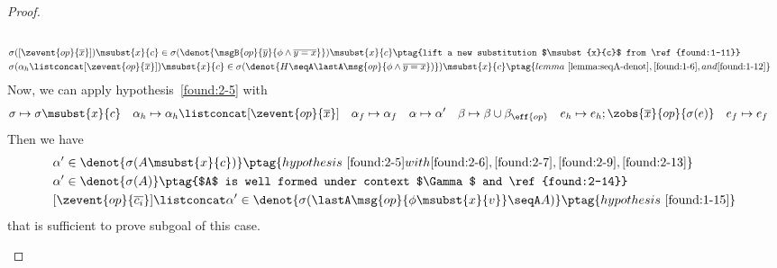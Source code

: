 \begin{proof}
\begin{enumerate}[label=Case]
{\begin{alignat}{2}
\\& \sigma([\zevent{op}{\overline{x}}])\msubst{x}{c} \in \sigma(\denot{\msgB{op}{\overline{y}}{\phi \land \overline{y = x}}})\msubst{x}{c} \ptag{lift a new substitution $\msubst{x}{c}$ from \ref{found:1-11}} \label{found:1-12}
\\& \sigma(\alpha_h \listconcat [\zevent{op}{\overline{x}}])\msubst{x}{c} \in \sigma(\denot{H \seqA \lastA\msg{op}{\phi \land \overline{y = x}})})\msubst{x}{c} \ptag{lemma~\ref{lemma:seqA-denot}, \ref{found:1-6}, and \ref{found:1-12}} \label{found:2-13}
\end{alignat}}\noindent
Now, we can apply hypothesis~\ref{found:2-5} with
{\footnotesize\begin{align*}
    &\sigma \mapsto \sigma\msubst{x}{c} \quad \alpha_h \mapsto \alpha_h \listconcat [\zevent{op}{\overline{x}}] \quad \alpha_f \mapsto \alpha_f \quad \alpha \mapsto \alpha' \quad \beta \mapsto \beta \cup \beta_{\eff{op}} \quad
    e_h \mapsto e_h; \zobs{\overline{x}}{op}{\sigma(e)} \quad e_f \mapsto e_f
\end{align*}}
Then we have
{\footnotesize\begin{alignat}{2}
&\alpha' \in\denot{\sigma(A\msubst{x}{c})} \ptag{hypothesis~\ref{found:2-5} with \ref{found:2-6}, \ref{found:2-7}, \ref{found:2-9}, \ref{found:2-13}} \label{found:2-14}
\\&\alpha' \in\denot{\sigma(A)} \ptag{$A$ is well formed under context $\Gamma$ and \ref{found:2-14}} \label{found:1-15}
\\&[\zevent{op}{\overline{c_i}}] \listconcat \alpha' \in\denot{\sigma(\lastA\msg{op}{\phi\msubst{x}{v}} \seqA A)}\ptag{hypothesis~\ref{found:1-15}} \label{found:1-16}
\end{alignat}}\noindent
that is sufficient to prove subgoal of this case.


\end{enumerate}
\end{proof}
